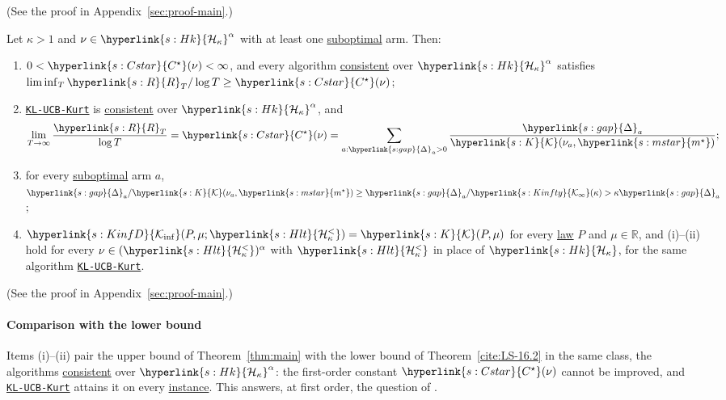 \documentclass[11pt]{article}
\newcommand{\R}{\mathbb{R}}
\newcommand{\sy}[2]{{\hyperlink{#1}{#2}}}
\newcommand{\term}[2]{\hyperlink{#1}{#2}}
\newcommand{\mstar}{\sy{s:mstar}{m^{\star}}}
\newcommand{\gap}{\sy{s:gap}{\Delta}}
\newcommand{\Kinf}{\sy{s:KinfD}{\mathcal{K}_{\inf}}}
\newcommand{\Hk}{\sy{s:Hk}{\mathcal{H}_{\kappa}}}
\newcommand{\Hlt}{\sy{s:Hlt}{\mathcal{H}^{<}_{\kappa}}}
\newcommand{\Kc}{\sy{s:K}{\mathcal{K}}}
\newcommand{\Kinfty}{\sy{s:Kinfty}{\mathcal{K}_{\infty}}}
\newcommand{\Reg}{\sy{s:R}{R}}
\newcommand{\Cst}{\sy{s:Cstar}{C^{\star}}}
\newcommand{\algo}{\hyperref[alg:kucb]{\texttt{KL-UCB-Kurt}}}
\begin{document}
(See the proof in Appendix~\ref{sec:proof-main}.)

\begin{corollary}\label{cor:exact}
Let $\kappa>1$ and $\nu\in\Hk^\alpha$ with at least one \term{w:subopt}{suboptimal} arm. Then:
\begin{enumerate}[label=(\roman*)]
  \item $0<\Cst(\nu)<\infty$, and every algorithm \term{w:consistent}{consistent} over $\Hk^\alpha$ satisfies
  $\liminf_T\Reg_T/\log T\ge\Cst(\nu)$;
  \item \algo{} is \term{w:consistent}{consistent} over $\Hk^\alpha$, and
  \begin{equation*}
    \lim_{T\to\infty}\frac{\Reg_T}{\log T}=\Cst(\nu)=\sum_{a:\gap_a>0}\frac{\gap_a}{\Kc(\nu_a,\mstar)};
  \end{equation*}
  \item for every \term{w:subopt}{suboptimal} arm $a$, $\gap_a/\Kc(\nu_a,\mstar)\ge\gap_a/\Kinfty(\kappa)>\kappa\gap_a$;
  \item $\Kinf(P,\mu;\Hlt)=\Kc(P,\mu)$ for every \term{w:law}{law} $P$ and $\mu\in\R$, and (i)--(ii) hold for every
  $\nu\in(\Hlt)^\alpha$ with $\Hlt$ in place of $\Hk$, for the same algorithm \algo{}.
\end{enumerate}
\end{corollary}

(See the proof in Appendix~\ref{sec:proof-main}.)

\paragraph{Comparison with the lower bound} Items (i)--(ii) pair the upper bound of Theorem~\ref{thm:main}
with the lower bound of Theorem~\ref{cite:LS-16.2} in the same class, the algorithms \term{w:consistent}{consistent} over
$\Hk^\alpha$: the first-order constant $\Cst(\nu)$ cannot be improved, and \algo{} attains it on every
\term{w:instance}{instance}. This answers, at first order, the question of \citet[Section~4]{L17}.
\end{document}
